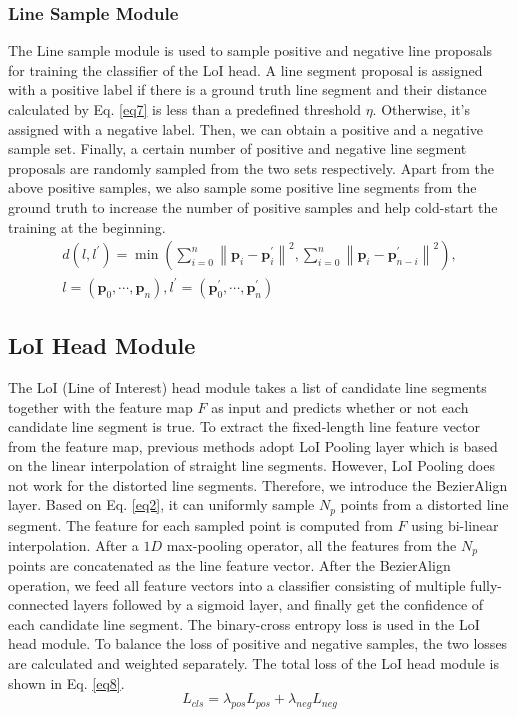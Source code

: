 \documentclass[letterpaper, 10 pt, conference]{ieeeconf}
\begin{document}
\subsubsection{\textbf{Line Sample Module}} \label{sec3-4-4} 
The Line sample module is used to sample positive and negative line proposals for training the classifier of the LoI head. A line segment proposal is assigned with a positive label if there is a ground truth line segment and their distance calculated by Eq. \ref{eq7} is less than a predefined threshold $\eta$. Otherwise, it's assigned with a negative label. Then, we can obtain a positive and a negative sample set. Finally, a certain number of positive and negative line segment proposals are randomly sampled from the two sets respectively. Apart from the above positive samples, we also sample some positive line segments from the ground truth to increase the number of positive samples and help cold-start \cite{LCNN} the training at the beginning.
\begin{equation} \label{eq7}
	\begin{array}{c}
		d(l,l^{\prime}) = \min \left(
		\sum_{i=0}^{n}\left\| \boldsymbol{p}_{i}-\boldsymbol{p}_{i}^{\prime} \right\|^{2},
		\sum_{i=0}^{n}\left\| \boldsymbol{p}_{i}-\boldsymbol{p}_{n-i}^{\prime} \right\|^{2} 
		\right), \\
		l = (\boldsymbol{p}_0,\cdots,\boldsymbol{p}_n), 
		l^{\prime} = (\boldsymbol{p}_0^{\prime},\cdots,\boldsymbol{p}_n^{\prime})
	\end{array}
\end{equation}

\subsection{LoI Head Module} \label{sec3-5}
The LoI (Line of Interest) head module takes a list of candidate line segments together with the feature map $F$ as input and predicts whether or not each candidate line segment is true. To extract the fixed-length line feature vector from the feature map, previous methods \cite{LCNN, HAWP} adopt LoI Pooling layer \cite{LCNN} which is based on the linear interpolation of straight line segments. However, LoI Pooling does not work for the distorted line segments. Therefore, we introduce the BezierAlign layer. Based on Eq. \ref{eq2}, it can uniformly sample $N_p$ points from a distorted line segment. The feature for each sampled point is computed from $F$ using bi-linear interpolation. After a $1D$ max-pooling operator, all the features from the $N_p$ points are concatenated as the line feature vector. After the BezierAlign operation, we feed all feature vectors into a classifier consisting of multiple fully-connected layers followed by a sigmoid layer, and finally get the confidence of each candidate line segment. The binary-cross entropy loss is used in the LoI head module. To balance the loss of positive and negative samples, the two losses are calculated and weighted separately. The total loss of the LoI head module is shown in Eq. \ref{eq8}.
\begin{equation} \label{eq8}
	L_{cls}=\lambda_{pos} L_{pos}+\lambda_{neg} L_{neg}
\end{equation}
\end{document}
